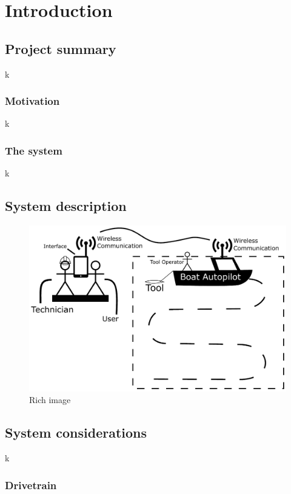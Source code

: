 \chapter{Introduction}

\section{Project summary}
k

\subsection{Motivation}
k

\subsection{The system}
k

\section{System description}
\begin{figure}[H]
	\centering
	\includegraphics[width=1\linewidth]{Images/rich_image}
	\caption{Rich image}
\end{figure}

\section{System considerations}
k

\subsection{Drivetrain}

